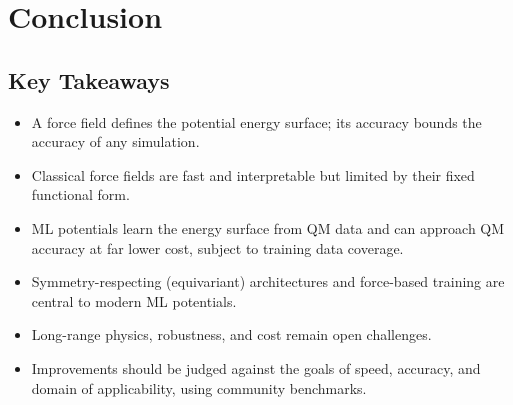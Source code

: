 \documentclass[english,course]{lecture}
\begin{document}

\vfill
\eject

\section{Conclusion}

\subsection{Key Takeaways}

\begin{itemize}
    \item A force field defines the potential energy surface; its accuracy bounds the accuracy of any simulation.
    \item Classical force fields are fast and interpretable but limited by their fixed functional form.
    \item ML potentials learn the energy surface from QM data and can approach QM accuracy at far lower cost, subject to training data coverage.
    \item Symmetry-respecting (equivariant) architectures and force-based training are central to modern ML potentials.
    \item Long-range physics, robustness, and cost remain open challenges.
    \item Improvements should be judged against the goals of speed, accuracy, and domain of applicability, using community benchmarks.
\end{itemize}
\end{document}
